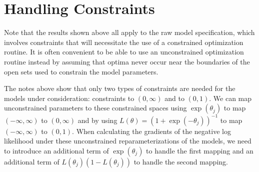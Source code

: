 \documentclass[12pt]{article}
\begin{document}
\section{Handling Constraints}
Note that the results shown above all apply to the raw model specification,
which involves constraints that will necessitate the use of a constrained
optimization routine. It is often convenient to be able to use an unconstrained
optimization routine instead by assuming that optima never occur near the
boundaries of the open sets used to constrain the model parameters.

The notes above show that only two types of constraints are needed for the
models under consideration: constraints to $(0, \infty)$ and to $(0, 1)$. We
can map unconstrained parameters to these constrained spaces using
$\exp(\theta_j)$ to map $(-\infty, \infty)$ to $(0, \infty)$ and by using
$L(\theta) = (1 + \exp(-\theta_j))^{-1}$ to map $(-\infty, \infty)$ to
$(0, 1)$. When calculating the gradients of the negative log likelihood under
these unconstrained reparameterizations of the models, we need to introduce an
additional term of $\exp(\theta_j)$ to handle the first mapping and an
additional term of $L(\theta_j) (1 - L(\theta_j))$ to handle the second
mapping.
\end{document}
